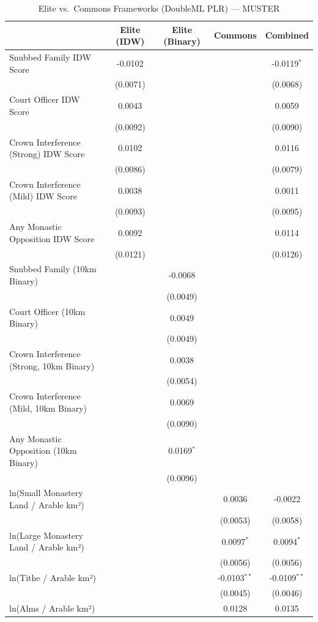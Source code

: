 \begin{table}[H]
\centering
\caption{Elite vs.\ Commons Frameworks (DoubleML PLR) --- MUSTER}
\label{tab:aipw_muster}
\begin{tabular}{lcccc}
\hline\hline
 & Elite (IDW) & Elite (Binary) & Commons & Combined \\
\hline
Snubbed Family IDW Score & -0.0102 &  &  & -0.0119$^{*}$ \\
 & (0.0071) &  &  & (0.0068) \\
Court Officer IDW Score & 0.0043 &  &  & 0.0059 \\
 & (0.0092) &  &  & (0.0090) \\
Crown Interference (Strong) IDW Score & 0.0102 &  &  & 0.0116 \\
 & (0.0086) &  &  & (0.0079) \\
Crown Interference (Mild) IDW Score & 0.0038 &  &  & 0.0011 \\
 & (0.0093) &  &  & (0.0095) \\
Any Monastic Opposition IDW Score & 0.0092 &  &  & 0.0114 \\
 & (0.0121) &  &  & (0.0126) \\
Snubbed Family (10km Binary) &  & -0.0068 &  &  \\
 &  & (0.0049) &  &  \\
Court Officer (10km Binary) &  & 0.0049 &  &  \\
 &  & (0.0049) &  &  \\
Crown Interference (Strong, 10km Binary) &  & 0.0038 &  &  \\
 &  & (0.0054) &  &  \\
Crown Interference (Mild, 10km Binary) &  & 0.0069 &  &  \\
 &  & (0.0090) &  &  \\
Any Monastic Opposition (10km Binary) &  & 0.0169$^{*}$ &  &  \\
 &  & (0.0096) &  &  \\
ln(Small Monastery Land / Arable km²) &  &  & 0.0036 & -0.0022 \\
 &  &  & (0.0053) & (0.0058) \\
ln(Large Monastery Land / Arable km²) &  &  & 0.0097$^{*}$ & 0.0094$^{*}$ \\
 &  &  & (0.0056) & (0.0056) \\
ln(Tithe / Arable km²) &  &  & -0.0103$^{**}$ & -0.0109$^{**}$ \\
 &  &  & (0.0045) & (0.0046) \\
ln(Alms / Arable km²) &  &  & 0.0128 & 0.0135 \\

\end{tabular}
\end{table}

